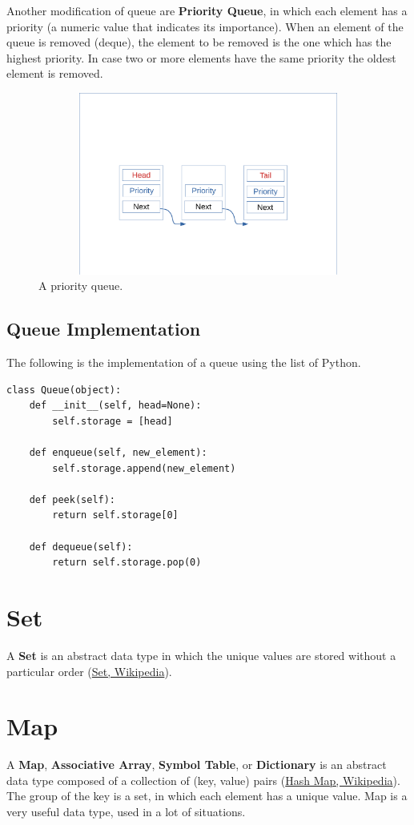 Another modification of queue are \textbf{Priority Queue}, in which each element has a priority (a numeric value that indicates its importance). When an element of the queue is removed (deque), the element to be removed is the one which has the highest priority. In case two or more elements have the same priority the oldest element is removed.

\begin{figure}[h]
	\includegraphics[width=14cm,height=6cm]{chapters/datastructures/images/queue_3.pdf}
	\caption[]{A priority queue.}
	\label{queue_3}
\end{figure}

\subsection{Queue Implementation}
The following is the implementation of a queue using the list of Python.
\begin{lstlisting}[caption={Queue implementation.}]
class Queue(object):
	def __init__(self, head=None):
		self.storage = [head]
	
	def enqueue(self, new_element):
		self.storage.append(new_element)
	
	def peek(self):
		return self.storage[0]
	
	def dequeue(self):
		return self.storage.pop(0)
\end{lstlisting}

\section{Set}
A \textbf{Set} is an abstract data type in which the unique values are stored without a particular order \cite{wikiset} (\href{https://en.wikipedia.org/wiki/Set_(abstract_data_type)}{Set, Wikipedia}).

\section{Map}
A \textbf{Map}, \textbf{Associative Array}, \textbf{Symbol Table}, or \textbf{Dictionary} is an abstract data type composed of a collection of (key, value) pairs \cite{wikihashmap} (\href{https://en.wikipedia.org/wiki/Associative_array}{Hash Map, Wikipedia}). The group of the key is a set, in which each element has a unique value. Map is a very useful data type, used in a lot of situations. 

